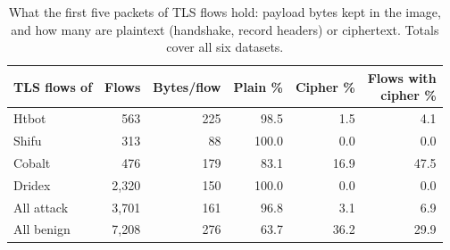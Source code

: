 \begin{table}[t]
\centering
\caption{What the first five packets of TLS flows hold: payload bytes kept in the image, and how many are plaintext (handshake, record headers) or ciphertext. Totals cover all six datasets.}
\label{tab:tls-bytes}
\setlength{\tabcolsep}{4pt}
\begin{tabular}{lrrrrr}
\toprule
TLS flows of & Flows & Bytes/flow & Plain \% & Cipher \% & \shortstack{Flows with\\cipher \%} \\
\midrule
Htbot & 563 & 225 & 98.5 & 1.5 & 4.1 \\
Shifu & 313 & 88 & 100.0 & 0.0 & 0.0 \\
Cobalt & 476 & 179 & 83.1 & 16.9 & 47.5 \\
Dridex & 2{,}320 & 150 & 100.0 & 0.0 & 0.0 \\
\midrule
All attack & 3{,}701 & 161 & 96.8 & 3.1 & 6.9 \\
All benign & 7{,}208 & 276 & 63.7 & 36.2 & 29.9 \\
\bottomrule
\end{tabular}
\end{table}
